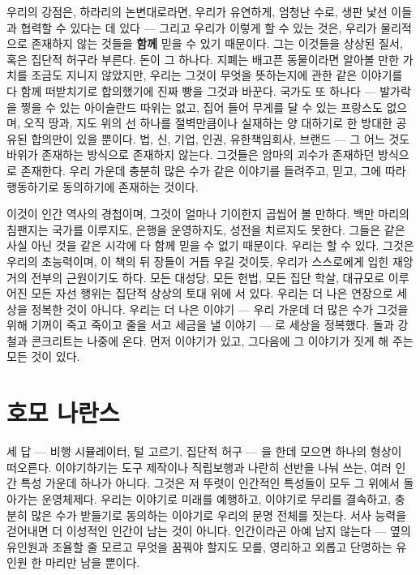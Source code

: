 우리의 강점은, 하라리의 논변대로라면, 우리가 유연하게, 엄청난 수로, 생판 낯선 이들과 협력할 수 있다는 데 있다 — 그리고 우리가 이렇게 할 수 있는 것은, 우리가 물리적으로 존재하지 않는 것들을 \textbf{함께} 믿을 수 있기 때문이다. 그는 이것들을 상상된 질서, 혹은 집단적 허구라 부른다. 돈이 그 하나다. 지폐는 배고픈 동물이라면 알아볼 만한 가치를 조금도 지니지 않았지만, 우리는 그것이 무엇을 뜻하는지에 관한 같은 이야기를 다 함께 떠받치기로 합의했기에 진짜 빵을 그것과 바꾼다. 국가도 또 하나다 — 발가락을 찧을 수 있는 아이슬란드 따위는 없고, 집어 들어 무게를 달 수 있는 프랑스도 없으며, 오직 땅과, 지도 위의 선 하나를 절벽만큼이나 실재하는 양 대하기로 한 방대한 공유된 합의만이 있을 뿐이다. 법, 신, 기업, 인권, 유한책임회사, 브랜드 — 그 어느 것도 바위가 존재하는 방식으로 존재하지 않는다. 그것들은 암마의 괴수가 존재하던 방식으로 존재한다. 우리 가운데 충분히 많은 수가 같은 이야기를 들려주고, 믿고, 그에 따라 행동하기로 동의하기에 존재하는 것이다.

이것이 인간 역사의 경첩이며, 그것이 얼마나 기이한지 곱씹어 볼 만하다. 백만 마리의 침팬지는 국가를 이루지도, 은행을 운영하지도, 성전을 치르지도 못한다. 그들은 같은 사실 아닌 것을 같은 시각에 다 함께 믿을 수 없기 때문이다. 우리는 할 수 있다. 그것은 우리의 초능력이며, 이 책의 뒤 장들이 거듭 우길 것이듯, 우리가 스스로에게 입힌 재앙 거의 전부의 근원이기도 하다. 모든 대성당, 모든 헌법, 모든 집단 학살, 대규모로 이루어진 모든 자선 행위는 집단적 상상의 토대 위에 서 있다. 우리는 더 나은 연장으로 세상을 정복한 것이 아니다. 우리는 더 나은 이야기 — 우리 가운데 더 많은 수가 그것을 위해 기꺼이 죽고 죽이고 줄을 서고 세금을 낼 이야기 — 로 세상을 정복했다. 돌과 강철과 콘크리트는 나중에 온다. 먼저 이야기가 있고, 그다음에 그 이야기가 짓게 해 주는 모든 것이 있다.

\section*{호모 나란스}

세 답 — 비행 시뮬레이터, 털 고르기, 집단적 허구 — 을 한데 모으면 하나의 형상이 떠오른다. 이야기하기는 도구 제작이나 직립보행과 나란히 선반을 나눠 쓰는, 여러 인간 특성 가운데 하나가 아니다. 그것은 저 뚜렷이 인간적인 특성들이 모두 그 위에서 돌아가는 운영체제다. 우리는 이야기로 미래를 예행하고, 이야기로 무리를 결속하고, 충분히 많은 수가 받들기로 동의하는 이야기로 우리의 문명 전체를 짓는다. 서사 능력을 걷어내면 더 이성적인 인간이 남는 것이 아니다. 인간이라곤 아예 남지 않는다 — 옆의 유인원과 조율할 줄 모르고 무엇을 꿈꿔야 할지도 모를, 영리하고 외롭고 단명하는 유인원 한 마리만 남을 뿐이다.

